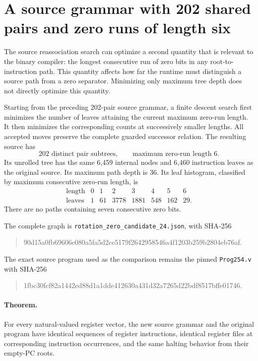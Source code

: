 \section{A source grammar with 202 shared pairs and zero runs of length six}
\label{sec:zero-six-source}

The source reassociation search can optimize a second quantity that is
relevant to the binary compiler: the longest consecutive run of zero
bits in any root-to-instruction path.  This quantity affects how far the
runtime must distinguish a source path from a zero separator.  Minimizing
only maximum tree depth does not directly optimize this quantity.

Starting from the preceding 202-pair source grammar, a finite descent
search first minimizes the number of leaves attaining the current
maximum zero-run length.  It then minimizes the corresponding counts at
successively smaller lengths.  All accepted moves preserve the complete
guarded successor relation.  The resulting source has
\[
 \boxed{202\text{ distinct pair subtrees},\qquad
        \text{maximum zero-run length }6.}
\]
Its unrolled tree has the same 6,459 internal nodes and 6,460 instruction
leaves as the original source.  Its maximum path depth is 36.  Its leaf
histogram, classified by maximum consecutive zero-run length, is
\[
\begin{array}{c|rrrrrrr}
\text{length}&0&1&2&3&4&5&6\\\hline
\text{leaves}&1&61&3778&1881&548&162&29.
\end{array}
\]
There are no paths containing seven consecutive zero bits.

The complete graph is \texttt{rotation\_zero\_candidate\_24.json}, with
SHA-256
\begin{quote}\ttfamily\small
90d15a0fb69606e080a5fa5d2ce5179f2642958546a4f1203b259b2804eb76af.
\end{quote}
The exact source program used as the comparison remains the pinned
\texttt{Prog254.v} with SHA-256
\begin{quote}\ttfamily\small
1fbc30fcf82a1442ed88d1a1dde412630a431d32a7265d22bdf8517bffe01746.
\end{quote}

\paragraph{Theorem.}
For every natural-valued register vector, the new source grammar and the
original program have identical sequences of register instructions,
identical register files at corresponding instruction occurrences, and
the same halting behavior from their empty-PC roots.

